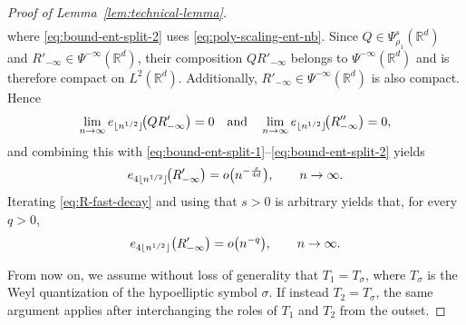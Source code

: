 \documentclass[a4paper,12pt]{article}
\let\originalleft\left
\let\originalright\right
\renewcommand{\left}{\mathopen{}\mathclose\bgroup\originalleft}
\renewcommand{\right}{\aftergroup\egroup\originalright}
\newcommand{\R}{\mathbb{R}}
\begin{document}
\begin{proof}[Proof of Lemma~\ref{lem:technical-lemma}]
\begin{align}
\label{eq:bound-ent-split-2}
\end{align}
where \eqref{eq:bound-ent-split-2} uses \eqref{eq:poly-scaling-ent-nb}. Since
$Q\in\Psi^{s}_{\rho_1}(\R^d)$ and $R'_{-\infty}\in\Psi^{-\infty}(\R^d)$,
their composition $Q R'_{-\infty}$ belongs to $\Psi^{-\infty}(\R^d)$
and is therefore compact on $L^2(\R^d)$.
Additionally, $R'_{-\infty}\in\Psi^{-\infty}(\R^d)$ is also compact.
Hence
\[
\lim_{n\to\infty}
e_{\lfloor n^{1/2}\rfloor}\!\left(Q R'_{-\infty}\right)
=
0
\quad \text{and} \quad 
\lim_{n\to\infty}
e_{\lfloor n^{1/2}\rfloor}\!\left(R''_{-\infty}\right)
=
0,
\]
and combining this with
\eqref{eq:bound-ent-split-1}–\eqref{eq:bound-ent-split-2} yields
\begin{equation}\label{eq:R-fast-decay}
e_{4\lfloor n^{1/2}\rfloor}\!\left(R'_{-\infty}\right)
=
o\left(n^{-\frac{s}{4d}}\right),
\qquad n\to\infty.
\end{equation}
\fi 
Iterating \eqref{eq:R-fast-decay} and using that $s>0$ is arbitrary yields that, for every $q>0$,
\begin{equation}\label{eq:R-fast-decay-q}
e_{4\lfloor n^{1/2}\rfloor} \left(R'_{-\infty}\right)
=
o \left(n^{-q}\right),
\qquad n\to\infty.
\end{equation}

From now on, we assume without loss of generality that \(T_1=T_\sigma\), where
\(T_\sigma\) is the Weyl quantization of the hypoelliptic symbol \(\sigma\).
If instead \(T_2=T_\sigma\), the same argument applies after interchanging the
roles of \(T_1\) and \(T_2\) from the outset.





\end{proof}
\end{document}
